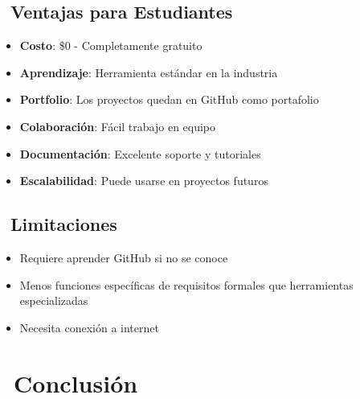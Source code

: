 \documentclass[12pt,a4paper]{article}
\begin{document}
\subsection{\faThumbsUp\ Ventajas para Estudiantes}

\begin{tcolorbox}[colback=successgreen!10, colframe=successgreen, rounded corners, boxrule=1pt]
\begin{itemize}[itemsep=0.3em]
    \item \textcolor{successgreen}{\faDollarSign} \textbf{Costo}: \$0 - Completamente gratuito
    \item \textcolor{headercolor}{\faGraduationCap} \textbf{Aprendizaje}: Herramienta estándar en la industria
    \item \textcolor{darkblue}{\faBriefcase} \textbf{Portfolio}: Los proyectos quedan en GitHub como portafolio
    \item \textcolor{warningorange}{\faUsers} \textbf{Colaboración}: Fácil trabajo en equipo
    \item \textcolor{gray}{\faBook} \textbf{Documentación}: Excelente soporte y tutoriales
    \item \textcolor{successgreen}{\faExpand} \textbf{Escalabilidad}: Puede usarse en proyectos futuros
\end{itemize}
\end{tcolorbox}

\subsection{\faExclamationTriangle\ Limitaciones}

\begin{tcolorbox}[colback=dangerred!10, colframe=dangerred, rounded corners, boxrule=1pt]
\begin{itemize}[itemsep=0.3em]
    \item \textcolor{dangerred}{\faLearning} Requiere aprender GitHub si no se conoce
    \item \textcolor{warningorange}{\faTools} Menos funciones específicas de requisitos formales que herramientas especializadas
    \item \textcolor{gray}{\faWifi} Necesita conexión a internet
\end{itemize}
\end{tcolorbox}

\section{\faCheckCircle\ Conclusión}
\end{document}
